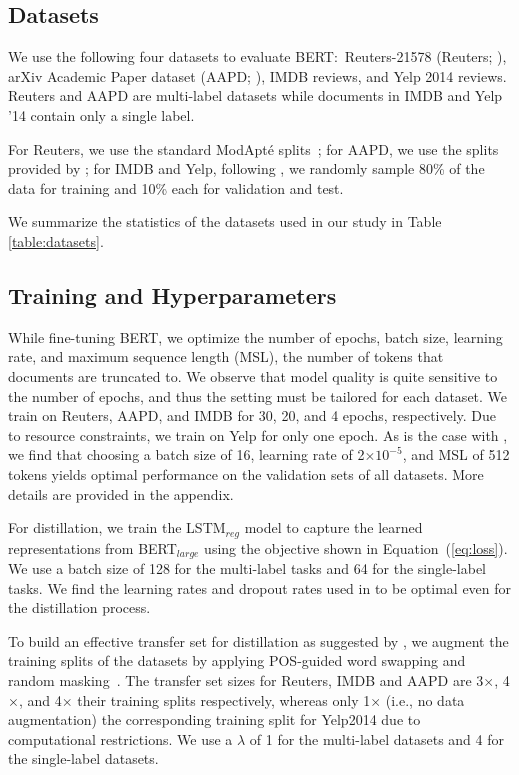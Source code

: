 \documentclass[11pt,a4paper]{article}
\newcommand{\BLSTMR}[1]{LSTM$_{reg}$}
\newcommand{\BERTL}[1]{BERT$_{large}$}
\begin{document}
\subsection{Datasets} \label{sec:datasets}

We use the following four datasets to evaluate BERT:\ Reuters-21578 (Reuters; \citealp{apte1994automated}), arXiv Academic Paper dataset (AAPD; \citealp{yang2018sgm}), IMDB reviews, and Yelp 2014 reviews.
Reuters and AAPD are multi-label datasets while documents in IMDB and Yelp '14 contain only a single label.

For Reuters, we use the standard ModApt\'{e} splits~\cite{apte1994automated}; for AAPD, we use the splits provided by \citet{yang2018sgm}; for IMDB and Yelp, following \citet{yang2016hierarchical}, we randomly sample 80\% of the data for training and 10\%  each for validation and test.

We summarize the statistics of the datasets used in our study in Table \ref{table:datasets}.

\subsection{Training and Hyperparameters}

While fine-tuning BERT, we optimize the number of epochs, batch size, learning rate, and maximum sequence length (MSL), the number of tokens that documents are truncated to.
We observe that model quality is quite sensitive to the number of epochs, and thus the setting must be tailored for each dataset.
We train on Reuters, AAPD, and IMDB for 30, 20, and 4 epochs, respectively.
Due to resource constraints, we train on Yelp for only one epoch.
As is the case with \citet{devlin2018bert}, we find that choosing a batch size of 16, learning rate of 2$\times 10^{-5}$, and MSL of 512 tokens yields optimal performance on the validation sets of all datasets.
More details are provided in the appendix.

For distillation, we train the \BLSTMR{} model to capture the learned representations from \BERTL{} using the objective shown in Equation~(\ref{eq:loss}).
We use a batch size of 128 for the multi-label tasks and 64 for the single-label tasks.
We find the learning rates and dropout rates used in \citet{adhikari2019rethinking} to be optimal even for the distillation process.

To build an effective transfer set for distillation as suggested by \citet{hintonkd}, we augment the training splits of the datasets by applying POS-guided word swapping and random masking~\cite{ralphdistill}.
The transfer set sizes for Reuters, IMDB and AAPD are 3$\times$, 4$\times$, and 4$\times$ their training splits respectively, whereas only 1$\times$ (i.e., no data augmentation) the corresponding training split for Yelp2014 due to computational restrictions.
We use a $\lambda$ of 1 for the multi-label datasets and 4 for the single-label datasets.
\end{document}
